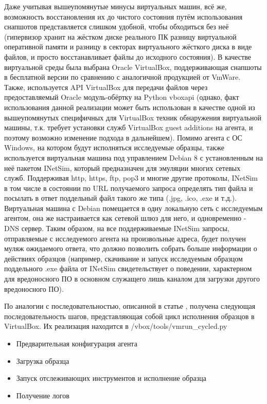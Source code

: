Даже учитывая вышеупомянутые минусы виртуальных машин, всё же, возможность восстановления их до чистого состояния путём использования снапшотов представляется слишком удобной, чтобы обходиться без неё (гипервизор хранит на жёстком диске реального ПК разницу виртуальной оперативной памяти и разницу в секторах виртуального жёсткого диска в виде файлов, и просто восстанавливает файлы до исходного состояния). В качестве виртуальной среды была выбрана Oracle VirtualBox, поддерживающая снапшоты в бесплатной версии по сравнению с аналогичной продукцией от VmWare. Также, используется API VirtualBox для передачи файлов через предоставляемый Oracle модуль-обёртку на Python vboxapi (однако, факт использования данной реализации может быть использован в качестве одной из вышеупомянутых специфичных для VirtualBox техник обнаружения виртуальной машины, т.к. требует установки служб VirtualBox guest additions на агента, и поэтому возможно изменение подхода в дальнейшем). Помимо агента с ОС Windows, на котором будут исполняться исследуемые образцы, также используется виртуальная машина под управлением Debian 8 с установленным на неё пакетом INetSim, который предназначен для эмуляции многих сетевых служб. Поддерживая http, https, ftp, pop3 и многие другие протоколы, INetSim в том числе в состоянии по URL получаемого запроса определять тип файла и посылать в ответ поддельный файл такого же типа (.jpg, .ico, .exe и т.д.). Виртуальная машина с Debian помещается в одну локальную сеть с исследуемым агентом, она же настраивается как сетевой шлюз для него, и одновременно - DNS сервер. Таким образом, на все поддерживаемые INetSim запросы, отправляемые с исследуемого агента на произвольные адреса, будет получен муляж ожидаемого ответа, что должно позволить собрать больше информации о действиях образцов (например, скачивание и запуск исследуемым образцом поддельного .exe файла от INetSim свидетельствует о поведении, характерном для вредоносного ПО в основном служащего лишь каналом для загрузки другого вредоносного ПО).

По аналогии с последовательностью, описанной в статье \cite {MASSMALWARE}, получена следующая последовательность шагов, представляющая собой цикл исполнения образцов в VirtualBox. Их реализация находится в /vbox/tools/vmrun\_cycled.py

\begin {itemize}
	\item Предварительная конфигурация агента
	\item Загрузка образца
	\item Запуск отслеживающих инструментов и исполнение образца
	\item Получение логов
\end {itemize}

